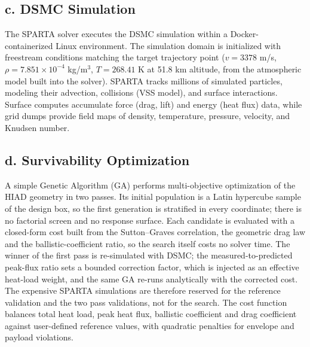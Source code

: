 \subsection*{c. DSMC Simulation}
The SPARTA solver executes the DSMC simulation within a Docker-containerized Linux environment. The simulation domain is initialized with freestream conditions matching the target trajectory point ($v = 3378$ m/s, $\rho = 7.851 \times 10^{-4}$ kg/m$^3$, $T = 268.41$ K at 51.8 km altitude, from the atmospheric model built into the solver). SPARTA tracks millions of simulated particles, modeling their advection, collisions (VSS model), and surface interactions. Surface computes accumulate force (drag, lift) and energy (heat flux) data, while grid dumps provide field maps of density, temperature, pressure, velocity, and Knudsen number.


\subsection*{d. Survivability Optimization}
A simple Genetic Algorithm (GA) performs multi-objective optimization of the HIAD geometry in two passes. Its initial population is a Latin hypercube sample of the design box, so the first generation is stratified in every coordinate; there is no factorial screen and no response surface. Each candidate is evaluated with a closed-form cost built from the Sutton--Graves correlation, the geometric drag law and the ballistic-coefficient ratio, so the search itself costs no solver time. The winner of the first pass is re-simulated with DSMC; the measured-to-predicted peak-flux ratio sets a bounded correction factor, which is injected as an effective heat-load weight, and the same GA re-runs analytically with the corrected cost. The expensive SPARTA simulations are therefore reserved for the reference validation and the two pass validations, not for the search. The cost function balances total heat load, peak heat flux, ballistic coefficient and drag coefficient against user-defined reference values, with quadratic penalties for envelope and payload violations.

